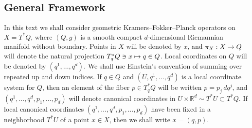 \documentclass[10pt]{amsart}
\theoremstyle{definition}\newtheorem{defi}[theo]{Definition}\newtheorem{rema}[theo]{Remark}\newtheorem{exam}[theo]{Example}\newtheorem{exem}[theo]{Example}\newtheorem{nota}[theo]{Notation}
\newcommand{\R}{\mathbb{R}}
\renewcommand*{\to}{\mathchoice{\longrightarrow}{\rightarrow}{\rightarrow}{\rightarrow}}
\let\oldmapsto\mapsto
\renewcommand*{\mapsto}{\mathchoice{\longmapsto}{\oldmapsto}{\oldmapsto}{\oldmapsto}}
\begin{document}
\subsection{General Framework}

In this text we shall consider geometric Kramers--Fokker--Planck operators on $X = T^* Q$, where $(Q, g)$ is a smooth compact $d$-dimensional Riemannian manifold without boundary. Points in $X$ will be denoted by $x$, and $\pi_{X}: X \to Q$ will denote the natural projection $T^*_q Q \ni x \mapsto q \in Q$. Local coordinates on $Q$ will be denoted by $(q^1, \dots, q^d)$. We shall use Einstein's convention of summing over repeated up and down indices. If $q \in Q$ and $(U, q^1, \dots, q^d)$ is a local coordinate system for $Q$, then an element of the fiber $p \in T^*_q Q$ will be written $p = p_j \, dq^j$, and $(q^1, \dots, q^d, p_1, \dots, p_d)$ will denote canonical coordinates in $U \times \R^d \sim T^* U \subset T^* Q$. If local canonical coordinates $(q^1, \dots, q^d, p_1, \dots, p_d)$ have been fixed in a neighborhood $T^* U$ of a point $x \in X$, then we shall write $x = (q,p)$.
\end{document}
